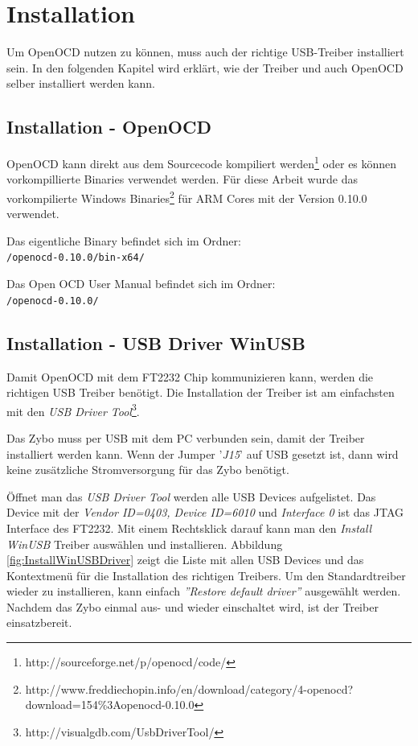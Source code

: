 \section{Installation}
Um OpenOCD nutzen zu können, muss auch der richtige USB-Treiber installiert sein.
In den folgenden Kapitel wird erklärt, wie der Treiber und auch OpenOCD selber installiert werden kann.


\subsection{Installation - OpenOCD}
OpenOCD kann direkt aus dem Sourcecode kompiliert werden\footnote{http://sourceforge.net/p/openocd/code/} oder es können vorkompillierte Binaries verwendet werden.
Für diese Arbeit wurde das vorkompilierte Windows Binaries\footnote{http://www.freddiechopin.info/en/download/category/4-openocd?download=154\%3Aopenocd-0.10.0} für ARM Cores mit der Version 0.10.0 verwendet.

Das eigentliche Binary befindet sich im Ordner:\\
\texttt{/openocd-0.10.0/bin-x64/} 

Das Open OCD User Manual\cite{bib:OpenOCDDoku} befindet sich im Ordner:\\
\texttt{/openocd-0.10.0/} 


\subsection{Installation - USB Driver WinUSB}
\label{kapitel:usbTreiber}
Damit OpenOCD mit dem FT2232 Chip kommunizieren kann, werden die richtigen USB Treiber benötigt.
Die Installation der Treiber ist am einfachsten mit den \textit{USB Driver Tool}\footnote{http://visualgdb.com/UsbDriverTool/}.

Das Zybo muss per USB mit dem PC verbunden sein, damit der Treiber installiert werden kann.
Wenn der Jumper '\textit{J15}' auf USB gesetzt ist, dann wird keine zusätzliche Stromversorgung für das Zybo benötigt.

Öffnet man das \textit{USB Driver Tool} werden alle USB Devices aufgelistet.
Das Device mit der \textit{Vendor ID=0403, Device ID=6010} und \textit{Interface 0} ist das JTAG Interface des FT2232.
Mit einem Rechtsklick darauf kann man den \textit{Install WinUSB} Treiber auswählen und installieren.
Abbildung \ref{fig:InstallWinUSBDriver} zeigt die Liste mit allen USB Devices und das Kontextmenü für die Installation des richtigen Treibers.
Um den Standardtreiber wieder zu installieren, kann einfach \textit{''Restore default driver''} ausgewählt werden.
Nachdem das Zybo einmal aus- und wieder einschaltet wird, ist der Treiber einsatzbereit.

